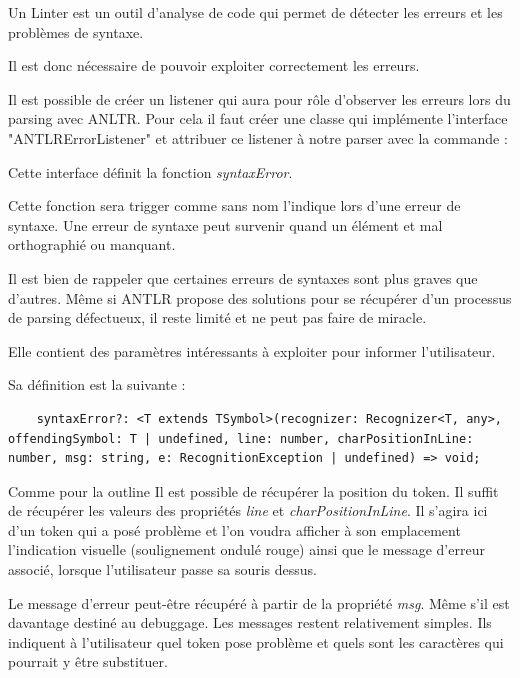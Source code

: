 \documentclass[
    iict, %
    il, %
]{heig-tb}
\begin{document}
Un Linter est un outil d'analyse de code qui permet de détecter les erreurs et les problèmes de syntaxe.

Il est donc nécessaire de pouvoir exploiter correctement les erreurs.

Il est possible de créer un listener qui aura pour rôle d'observer les erreurs lors du parsing avec ANLTR.
Pour cela il faut créer une classe qui implémente l'interface "ANTLRErrorListener" et attribuer ce listener à notre parser
avec la commande :

Cette interface définit la fonction \emph{syntaxError}.

Cette fonction sera trigger comme sans nom l'indique lors d'une erreur de syntaxe.
Une erreur de syntaxe peut survenir quand un élément et mal orthographié ou manquant.

Il est bien de rappeler que certaines erreurs de syntaxes sont plus graves que d'autres.
Même si ANTLR propose des solutions pour se récupérer d'un processus de parsing défectueux, il reste limité et ne peut pas faire de miracle.

Elle contient des paramètres intéressants à exploiter pour informer l'utilisateur.

Sa définition est la suivante :
\begin{lstlisting}
    syntaxError?: <T extends TSymbol>(recognizer: Recognizer<T, any>, offendingSymbol: T | undefined, line: number, charPositionInLine: number, msg: string, e: RecognitionException | undefined) => void;
\end{lstlisting}


Comme pour la outline %
Il est possible de récupérer la position du token. Il suffit de récupérer les valeurs des propriétés \emph{line} et \emph{charPositionInLine}.
Il s'agira ici d'un token qui a posé problème et l'on voudra afficher à son emplacement l'indication visuelle (soulignement ondulé rouge) ainsi que le message d'erreur associé, lorsque l'utilisateur passe
sa souris dessus.

Le message d'erreur peut-être récupéré à partir de la propriété \emph{msg}. Même s'il est davantage destiné au debuggage.
Les messages restent relativement simples. Ils indiquent à l'utilisateur quel token pose problème et quels sont les caractères qui pourrait y être substituer.
\end{document}
